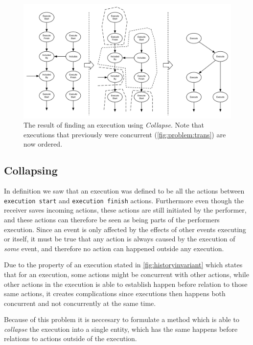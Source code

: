 	\begin{figure}
		\centering
		\includegraphics[width=\textwidth]{6orderofexecution/images/collapse.pdf}
		\caption{The result of finding an execution using \textit{Collapse}. Note that executions that previously were concurrent (\autoref{fig:problem:trans}) are now ordered.}
		\label{fig:problem:collapse}
	\end{figure}
	
	\subsection{Collapsing}
	In definition  we saw that an execution was defined to be all the actions between \texttt{execution start} and \texttt{execution finish} actions. Furthermore even though the receiver  saves incoming actions, these actions are still initiated by the performer, and these actions can therefore be seen as being parts of the performers execution. Since an event is only affected by the effects of other events executing or itself, it must be true that any action is always caused by the execution of \textit{some} event, and therefore no action can happened outside any execution.
	
	
	\newpar 
	Due to the property of an execution stated in \autoref{fig:historyinvariant} which states that for an execution, some actions might be concurrent with other actions, while other actions in the execution is able to establish happen before relation to those same actions, it creates complications since executions then happens both concurrent and not concurrently at the same time. 
	
	Because of this problem it is neccesary to formulate a method which is able to \textit{collapse} the execution into a single entity, which has the same happens before relations to actions outside of the execution.
	
